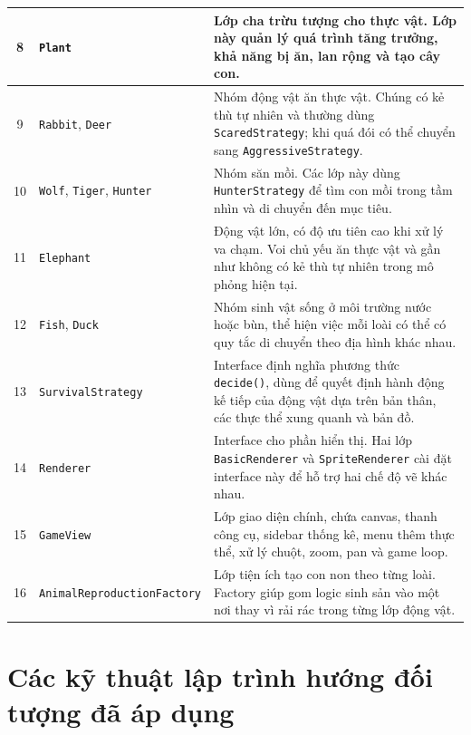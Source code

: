 \documentclass[12pt,a4paper]{article}
\begin{document}
\begin{longtable}{|c|p{4cm}|p{8cm}|}
    \hline
    8 & \texttt{Plant} & Lớp cha trừu tượng cho thực vật. Lớp này quản lý quá trình tăng trưởng, khả năng bị ăn, lan rộng và tạo cây con. \\
    \hline
    9 & \texttt{Rabbit}, \texttt{Deer} & Nhóm động vật ăn thực vật. Chúng có kẻ thù tự nhiên và thường dùng \texttt{ScaredStrategy}; khi quá đói có thể chuyển sang \texttt{AggressiveStrategy}. \\
    \hline
    10 & \texttt{Wolf}, \texttt{Tiger}, \texttt{Hunter} & Nhóm săn mồi. Các lớp này dùng \texttt{HunterStrategy} để tìm con mồi trong tầm nhìn và di chuyển đến mục tiêu. \\
    \hline
    11 & \texttt{Elephant} & Động vật lớn, có độ ưu tiên cao khi xử lý va chạm. Voi chủ yếu ăn thực vật và gần như không có kẻ thù tự nhiên trong mô phỏng hiện tại. \\
    \hline
    12 & \texttt{Fish}, \texttt{Duck} & Nhóm sinh vật sống ở môi trường nước hoặc bùn, thể hiện việc mỗi loài có thể có quy tắc di chuyển theo địa hình khác nhau. \\
    \hline
    13 & \texttt{SurvivalStrategy} & Interface định nghĩa phương thức \texttt{decide()}, dùng để quyết định hành động kế tiếp của động vật dựa trên bản thân, các thực thể xung quanh và bản đồ. \\
    \hline
    14 & \texttt{Renderer} & Interface cho phần hiển thị. Hai lớp \texttt{BasicRenderer} và \texttt{SpriteRenderer} cài đặt interface này để hỗ trợ hai chế độ vẽ khác nhau. \\
    \hline
    15 & \texttt{GameView} & Lớp giao diện chính, chứa canvas, thanh công cụ, sidebar thống kê, menu thêm thực thể, xử lý chuột, zoom, pan và game loop. \\
    \hline
    16 & \texttt{AnimalReproductionFactory} & Lớp tiện ích tạo con non theo từng loài. Factory giúp gom logic sinh sản vào một nơi thay vì rải rác trong từng lớp động vật. \\
    \hline
\end{longtable}

\section{Các kỹ thuật lập trình hướng đối tượng đã áp dụng}
\end{document}
